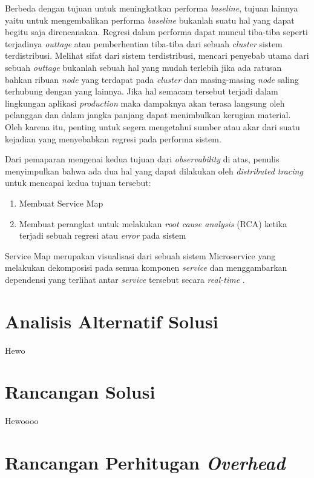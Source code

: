 Berbeda dengan tujuan untuk meningkatkan performa \textit{baseline}, tujuan lainnya yaitu untuk mengembalikan performa \textit{baseline} bukanlah suatu hal yang dapat begitu saja direncanakan. Regresi dalam performa dapat muncul tiba-tiba seperti terjadinya \textit{outtage} atau pemberhentian tiba-tiba dari sebuah \textit{cluster} sistem terdistribusi. Melihat sifat dari sistem terdistribusi, mencari penyebab utama dari sebuah \textit{outtage} bukanlah sebuah hal yang mudah terlebih jika ada ratusan bahkan ribuan \textit{node} yang terdapat pada \textit{cluster} dan masing-masing \textit{node} saling terhubung dengan yang lainnya. Jika hal semacam tersebut terjadi dalam lingkungan aplikasi \textit{production} maka dampaknya akan terasa langsung oleh pelanggan dan dalam jangka panjang dapat menimbulkan kerugian material. Oleh karena itu, penting untuk segera mengetahui sumber atau akar dari suatu kejadian yang menyebabkan regresi pada performa sistem.

Dari pemaparan mengenai kedua tujuan dari \textit{observability} di atas, penulis menyimpulkan bahwa ada dua hal yang dapat dilakukan oleh \textit{distributed tracing} untuk mencapai kedua tujuan tersebut:
\begin{enumerate}
	\item Membuat Service Map
	\item Membuat perangkat untuk melakukan \textit{root cause analysis} (RCA) ketika terjadi sebuah regresi atau \textit{error} pada sistem
\end{enumerate}

Service Map merupakan visualisasi dari sebuah sistem Microservice yang melakukan dekomposisi pada semua komponen \textit{service} dan menggambarkan dependensi yang terlihat antar \textit{service} tersebut secara \textit{real-time} \citep{datadog-svcmap}.





%



\section{Analisis Alternatif Solusi}
Hewo

\section{Rancangan Solusi}

Hewoooo
\section{Rancangan Perhitugan \textit{Overhead}}


